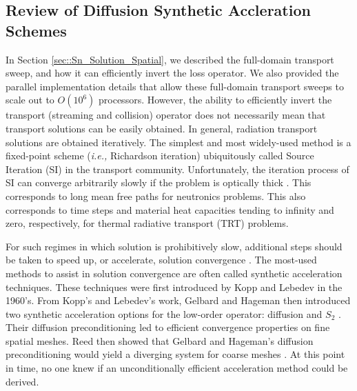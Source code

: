 \subsection{Review of Diffusion Synthetic Accleration Schemes}
\label{sec::DSA_Introduction_History}

In Section \ref{sec::Sn_Solution_Spatial}, we described the full-domain transport sweep, and how it can efficiently invert the loss operator. We also provided the parallel implementation details that allow these full-domain transport sweeps to scale out to $O(10^6)$ processors. However, the ability to efficiently invert the transport (streaming and collision) operator does not necessarily mean that transport solutions can be easily obtained. In general, radiation transport solutions are obtained iteratively. The simplest and most widely-used method is a fixed-point scheme ({\em i.e.,} Richardson iteration) ubiquitously called Source Iteration (SI) in the transport community. Unfortunately, the iteration process of SI can converge arbitrarily slowly if the problem is optically thick \cite{ref::adams_larsen_iter_methods}. This corresponds to long mean free paths for neutronics problems. This also corresponds to time steps and material heat capacities tending to infinity and zero, respectively, for thermal radiative transport (TRT) problems.

For such regimes in which solution is prohibitively slow, additional steps should be taken to speed up, or accelerate, solution convergence \cite{ref::adams_larsen_iter_methods}. The most-used methods to assist in solution convergence are often called synthetic acceleration techniques. These techniques were first introduced by Kopp \cite{kopp1963synthetic} and Lebedev \cite{lebedevI,lebedevII,lebedevIII,lebedevIV,lebedevV,lebedevVI,lebedevVII} in the 1960's. From Kopp's and Lebedev's work, Gelbard and Hageman then introduced two synthetic acceleration options for the low-order operator: diffusion and $S_2$ \cite{gelbard1969synthetic}. Their diffusion preconditioning led to efficient convergence properties on fine spatial meshes. Reed then showed that Gelbard and Hageman's diffusion preconditioning would yield a diverging system for coarse meshes \cite{reed1971effectiveness}. At this point in time, no one knew if an unconditionally efficient acceleration method could be derived.

